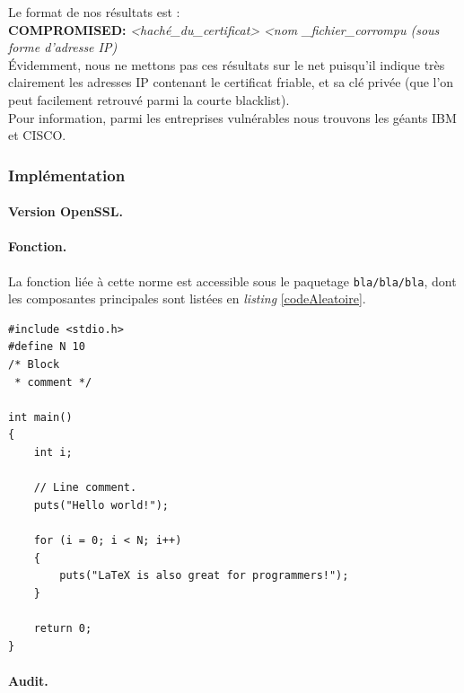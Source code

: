 		Le format de nos résultats est : \\
		
		\textbf{COMPROMISED:} \textit{<haché\_du\_certificat>} \textit{<nom
		\_fichier\_corrompu (sous forme d'adresse IP)}\\
		
		Évidemment, nous ne mettons pas ces résultats sur le net puisqu'il indique 
		très clairement les adresses IP contenant le certificat friable, et sa clé
		privée (que l'on peut facilement retrouvé parmi la courte blacklist).\\
		
		Pour information, parmi les entreprises vulnérables nous trouvons les géants
		IBM et CISCO.
	
	\subsubsection{Implémentation}
		
		\paragraph{Version OpenSSL.\\}
		
		\paragraph{Fonction.\\}
		La fonction liée à cette norme est accessible sous le paquetage \texttt{bla/bla/bla}, dont les composantes principales sont listées en \textit{listing} \ref{codeAleatoire}.
		
		
		\begin{lstlisting}[style=customc,caption=codeAleatoire.c, label=codeAleatoire]
#include <stdio.h>
#define N 10
/* Block
 * comment */
 
int main()
{
    int i;
 
    // Line comment.
    puts("Hello world!");
 
    for (i = 0; i < N; i++)
    {
        puts("LaTeX is also great for programmers!");
    }
 
    return 0;
}
		\end{lstlisting}
		
		
		
		\paragraph{Audit.\\}

